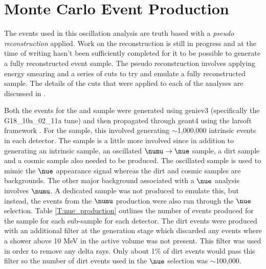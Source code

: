 \section{Monte Carlo Event Production}

The events used in this oscillation analysis are truth based with a \textit{pseudo reconstruction} applied. Work on the reconstruction is still in progress and at the time of writing hasn't been sufficiently completed for it to be possible to generate a fully reconstructed event sample. The pseudo reconstruction involves applying energy smearing and a series of cuts to try and emulate a fully reconstructed sample. The details of the cuts that were applied to each of the analyses are discussed in .

Both the events for the \numu and \nue sample were generated using \gls{genie}v3 (specifically the G18\_10a\_02\_11a tune) and then propagated through \gls{geant4} using the \gls{larsoft} framework \cite{GENIE}\cite{GENIE_V3_Paper}\cite{GENIE_tune}\cite{Geant4_website}\cite{larsoft}. For the \numu sample, this involved generating $\sim$1,000,000 intrinsic \numu events in each detector. The \nue sample is a little more involved since in addition to generating an intrinsic sample, an oscillated $\numu \rightarrow \nue$ sample, a dirt sample and a cosmic sample also needed to be produced. The oscillated sample is used to mimic the $\nue$ appearance signal whereas the dirt and cosmic samples are backgrounds. The other major background associated with a $\nue$ analysis involves $\numu$. A dedicated sample was not produced to emulate this, but instead, the events from the $\numu$ production were also run through the $\nue$ selection. Table \ref{T:nue_production} outlines the number of events produced for the \nue sample for each sub-sample for each detector. The dirt events were produced with an additional filter at the generation stage which discarded any events where a shower above 10 MeV in the active volume was not present. This filter was used in order to remove any delta rays. Only about 1\% of dirt events would pass this filter so the number of dirt events used in the $\nue$ selection was $\sim$100,000. 


